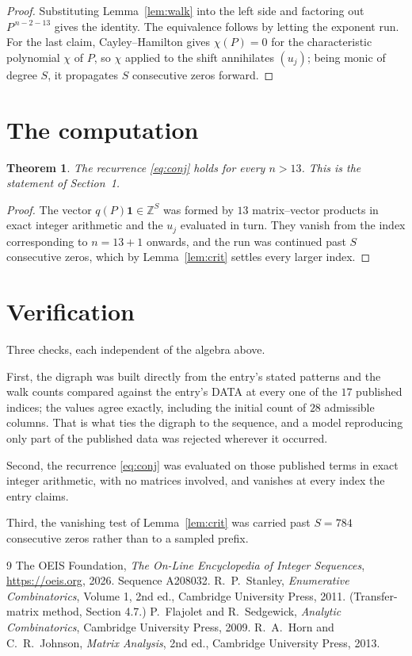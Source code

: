 \documentclass[11pt,a4paper]{article}
\theoremstyle{plain}
\newtheorem{theorem}{Theorem}
\theoremstyle{definition}
\begin{document}
\begin{proof}
Substituting Lemma~\ref{lem:walk} into the left side and factoring out
$P^{\,n-2-13}$ gives the identity. The equivalence follows by letting the exponent
run. For the last claim, Cayley--Hamilton gives $\chi(P)=0$ for the characteristic
polynomial $\chi$ of $P$, so $\chi$ applied to the shift annihilates $(u_j)$; being monic of
degree $S$, it propagates $S$ consecutive zeros forward.
\end{proof}

\section{The computation}

\begin{theorem}
The recurrence \eqref{eq:conj} holds for every $n>13$. This is the statement of
Section~1.
\end{theorem}

\begin{proof}
The vector $q(P)\mathbf{1}\in\mathbb{Z}^{S}$ was formed by $13$ matrix--vector
products in exact integer arithmetic and the $u_j$ evaluated in turn. They vanish from the
index corresponding to $n=13+1$ onwards, and the run was continued past $S$ consecutive
zeros, which by Lemma~\ref{lem:crit} settles every larger index.
\end{proof}

\section{Verification}

Three checks, each independent of the algebra above.

First, the digraph was built directly from the entry's stated patterns and the walk counts
compared against the entry's DATA at every one of the $17$ published indices; the
values agree exactly, including the initial count of $28$ admissible columns. That is
what ties the digraph to the sequence, and a model reproducing only part of the published
data was rejected wherever it occurred.

Second, the recurrence \eqref{eq:conj} was evaluated on those published terms in exact
integer arithmetic, with no matrices involved, and vanishes at every index the entry claims.

Third, the vanishing test of Lemma~\ref{lem:crit} was carried past $S=784$ consecutive
zeros rather than to a sampled prefix.

\begin{thebibliography}{9}
 The OEIS Foundation, \emph{The On-Line Encyclopedia of Integer
Sequences}, \url{https://oeis.org}, 2026. Sequence A208032.
 R.~P.~Stanley, \emph{Enumerative Combinatorics}, Volume 1, 2nd ed.,
Cambridge University Press, 2011. (Transfer-matrix method, Section 4.7.)
 P.~Flajolet and R.~Sedgewick, \emph{Analytic Combinatorics}, Cambridge
University Press, 2009.
 R.~A.~Horn and C.~R.~Johnson, \emph{Matrix Analysis}, 2nd ed., Cambridge
University Press, 2013.
\end{thebibliography}
\end{document}
